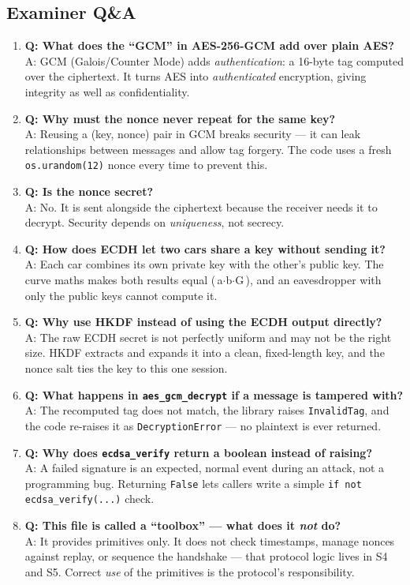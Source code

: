 \documentclass[11pt,a4paper]{report}
\begin{document}
\subsection{Examiner Q\&A}
\begin{enumerate}
  \item \textbf{Q: What does the ``GCM'' in AES-256-GCM add over plain AES?}\\
        A: GCM (Galois/Counter Mode) adds \emph{authentication}: a 16-byte tag
        computed over the ciphertext. It turns AES into \emph{authenticated}
        encryption, giving integrity as well as confidentiality.
  \item \textbf{Q: Why must the nonce never repeat for the same key?}\\
        A: Reusing a (key, nonce) pair in GCM breaks security --- it can leak
        relationships between messages and allow tag forgery. The code uses a
        fresh \texttt{os.urandom(12)} nonce every time to prevent this.
  \item \textbf{Q: Is the nonce secret?}\\
        A: No. It is sent alongside the ciphertext because the receiver needs it
        to decrypt. Security depends on \emph{uniqueness}, not secrecy.
  \item \textbf{Q: How does ECDH let two cars share a key without sending it?}\\
        A: Each car combines its own private key with the other's public key.
        The curve maths makes both results equal (\,a$\cdot$b$\cdot$G\,), and an
        eavesdropper with only the public keys cannot compute it.
  \item \textbf{Q: Why use HKDF instead of using the ECDH output directly?}\\
        A: The raw ECDH secret is not perfectly uniform and may not be the right
        size. HKDF extracts and expands it into a clean, fixed-length key, and
        the nonce salt ties the key to this one session.
  \item \textbf{Q: What happens in \texttt{aes\_gcm\_decrypt} if a message is
        tampered with?}\\
        A: The recomputed tag does not match, the library raises
        \texttt{InvalidTag}, and the code re-raises it as \texttt{DecryptionError}
        --- no plaintext is ever returned.
  \item \textbf{Q: Why does \texttt{ecdsa\_verify} return a boolean instead of
        raising?}\\
        A: A failed signature is an expected, normal event during an attack, not
        a programming bug. Returning \texttt{False} lets callers write a simple
        \texttt{if not ecdsa\_verify(...)} check.
  \item \textbf{Q: This file is called a ``toolbox'' --- what does it \emph{not}
        do?}\\
        A: It provides primitives only. It does not check timestamps, manage
        nonces against replay, or sequence the handshake --- that protocol logic
        lives in S4 and S5. Correct \emph{use} of the primitives is the
        protocol's responsibility.
\end{enumerate}
\end{document}
